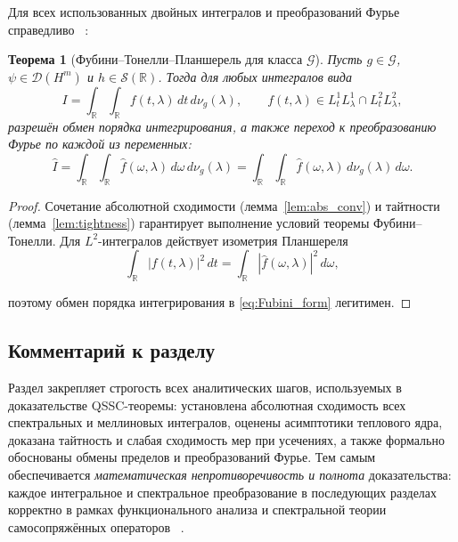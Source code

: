 \documentclass{article}
\numberwithin{equation}{section}
\theoremstyle{plain}
\newtheorem{theorem}{Теорема}
\theoremstyle{definition}
\theoremstyle{remark}
\def\omega{ω}\def\Omega{Ω}\def\hbar{ℏ}\def\nabla{∇}%
\begin{document}
Для всех использованных двойных интегралов и преобразований Фурье справедливо ~\cite{Folland1999}:

\begin{theorem}[Фубини–Тонелли–Планшерель для класса $\mathcal G$]
\label{thm:FubiniTonelli}
Пусть $g\in\mathcal G$, $\psi\in\mathcal D(H^m)$ и $h\in\mathcal S(\mathbb R)$.  
Тогда для любых интегралов вида
\begin{equation}
\label{eq:Fubini_form}
I=\int_{\mathbb R}\!\int_{\mathbb R}f(t,\lambda)\,dt\,d\nu_g(\lambda),
\qquad
f(t,\lambda)\in L^1_tL^1_\lambda\cap L^2_tL^2_\lambda,
\end{equation}
разрешён обмен порядка интегрирования, а также переход к преобразованию Фурье
по каждой из переменных:
\begin{equation}
\widehat I
=\int_{\mathbb R}\!\int_{\mathbb R}\widehat f(\omega,\lambda)\,d\omega\,d\nu_g(\lambda)
=\int_{\mathbb R}\!\int_{\mathbb R}\widehat f(\omega,\lambda)\,d\nu_g(\lambda)\,d\omega.
\label{eq:QSSC0034}
\end{equation}

\end{theorem}

\begin{proof}
Сочетание абсолютной сходимости (лемма~\ref{lem:abs_conv}) и тайтности
(лемма~\ref{lem:tightness}) гарантирует выполнение условий теоремы Фубини–Тонелли.
Для $L^2$-интегралов действует изометрия Планшереля
\begin{equation}
\int_{\mathbb R}|f(t,\lambda)|^2\,dt
=\int_{\mathbb R}|\widehat f(\omega,\lambda)|^2\,d\omega,
\label{eq:QSSC0035}
\end{equation}

поэтому обмен порядка интегрирования в \eqref{eq:Fubini_form} легитимен.
\end{proof}

\subsection{Комментарий к разделу}
\label{subsec:summary9}

Раздел закрепляет строгость всех аналитических шагов, используемых в доказательстве QSSC-теоремы:
установлена абсолютная сходимость всех спектральных и меллиновых интегралов,
оценены асимптотики теплового ядра, доказана тайтность и слабая сходимость мер при усечениях,
а также формально обоснованы обмены пределов и преобразований Фурье.
Тем самым обеспечивается \emph{математическая непротиворечивость и полнота} доказательства:
каждое интегральное и спектральное преобразование в последующих разделах корректно
в рамках функционального анализа и спектральной теории самосопряжённых операторов ~\cite{Yosida1980}.
\end{document}
